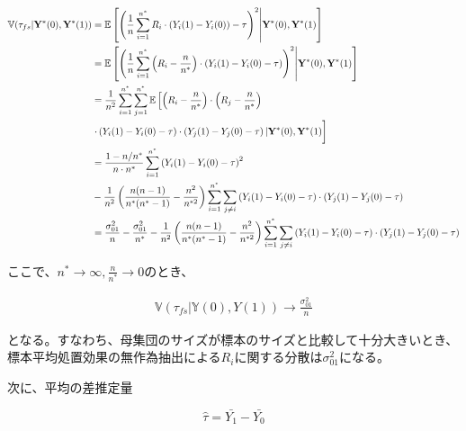 \documentclass[a4paper]{bxjsarticle}
\begin{document}
\begin{equation}
\begin{split}
\mathbb{V}(\tau_{fs} | \mathbf{Y}^\ast(0), \mathbf{Y}^\ast(1)) &= \mathbb{E}\left[ \left(\frac{1}{n}\sum_{i=1}^{n^\ast} R_i \cdot \left(Y_i(1) - Y_i(0)\right) - \tau  \right)^2 \middle \vert \mathbf{Y}^\ast(0), \mathbf{Y}^\ast(1)  \right] \\\
&= \mathbb{E}\left[ \left(\frac{1}{n}\sum_{i=1}^{n^{\ast}} \left(R_i - \frac{n}{n^\ast}\right) \cdot \left(Y_i(1) - Y_i(0) - \tau \right)  \right)^2 \middle\vert \mathbf{Y}^\ast(0), \mathbf{Y}^\ast(1)  \right] \\\
&= \frac{1}{n^2} \sum_{i=1} ^{n^\ast} \sum_{j=1} ^{n^\ast} \mathbb{E}\left[ \left(R_{i} - \frac{n}{n^{\ast}} \right ) \cdot \left( R_j - \frac{n}{n^{\ast}} \right) \right. \\\
&\left. \cdot \left( Y_i(1) - Y_i(0) - \tau \right) \cdot \left(Y_j(1) - Y_j(0) - \tau \right) \vert \mathbf{Y}^\ast(0), \mathbf{Y}^\ast(1) \vphantom{\left(R_{i} - \frac{n}{n_{sp}} \right )} \right] \\\
&= \frac{1 - n/n^\ast}{n \cdot n^\ast} \sum_{i=1}^{n^\ast} \left(Y_i(1) - Y_i(0)- \tau \right)^2 \\\
&- \frac{1}{n^2}\left(\frac{n(n-1)}{n^\ast (n^\ast - 1)} - \frac{n^2}{n^{\ast2}}\right) \sum_{i=1}^{n^\ast} \sum_{j\neq i} \left( Y_i(1) - Y_i(0) - \tau \right) \cdot \left(Y_j(1) - Y_j(0) - \tau \right) \\\
&= \frac{\sigma_{01}^2}{n} - \frac{\sigma_{01}^2}{n^\ast} - \frac{1}{n^2}\left(\frac{n(n-1)}{n^\ast (n^\ast - 1)} - \frac{n^2}{n^{\ast2}}\right) \sum_{i=1}^{n^\ast} \sum_{j\neq i} \left(Y_i(1) - Y_i(0) - \tau \right) \cdot \left(Y_j(1) - Y_j(0) - \tau \right)
\end{split}
\end{equation} 

ここで、$n^\ast \to \infty, \frac{n}{n^\ast} \to 0$のとき、

\begin{equation}
\begin{split}
\mathbb{V}(\tau_{fs} | \mathbb{Y}(0) , Y (1))  \to \frac{\sigma^2_{01}}{n}
\end{split}
\end{equation}

となる。すなわち、母集団のサイズが標本のサイズと比較して十分大きいとき、標本平均処置効果の無作為抽出による$R_i$に関する分散は$\sigma^2_{01}$になる。

次に、平均の差推定量

\begin{equation}
\hat{\tau} = \bar{Y_1} - \bar{Y_0}
\end{equation}
\end{document}
